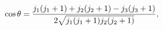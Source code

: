 \[\mathop{\cos\/}\nolimits\theta=\frac{j_{1}(j_{1}+1)+j_{2}(j_{2}+1)-j_{3}(j_{3}%
+1)}{2\sqrt{j_{1}(j_{1}+1)j_{2}(j_{2}+1)}},\]